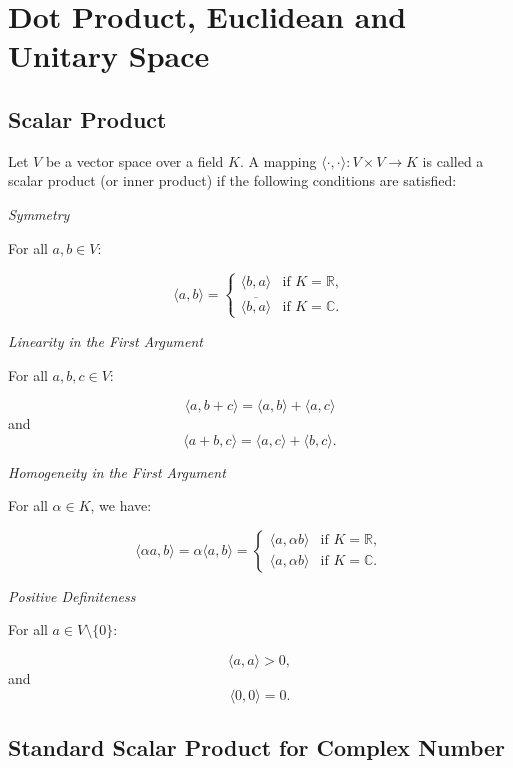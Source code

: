\newpage
\section{Dot Product, Euclidean and Unitary Space}

\subsection{Scalar Product}

Let \(V\) be a vector space over a field \(K\). A mapping \(\langle \cdot, \cdot \rangle : V \times V \to K\) is called a scalar product (or inner product) if the following conditions are satisfied:
\vspace{\baselineskip}

\emph{Symmetry}

For all \(a, b \in V\):

\[
\langle a, b \rangle = 
\begin{cases}
\langle b, a \rangle & \text{if } K = \mathbb{R}, \\
\overline{\langle b, a \rangle} & \text{if } K = \mathbb{C}.
\end{cases}
\]

\emph{Linearity in the First Argument}

For all \(a, b, c \in V\):

\[
\langle a, b + c \rangle = \langle a, b \rangle + \langle a, c \rangle
\]
and
\[
\langle a + b, c \rangle = \langle a, c \rangle + \langle b, c \rangle.
\]

\emph{Homogeneity in the First Argument}

For all \(\alpha \in K\), we have:

\[
\langle \alpha a, b \rangle = \alpha \langle a, b \rangle = 
\begin{cases}
\langle a, \alpha b \rangle & \text{if } K = \mathbb{R}, \\
\langle a, \alpha b \rangle & \text{if } K = \mathbb{C}.
\end{cases}
\]

\emph{Positive Definiteness}

For all \(a \in V \setminus \{0\}\):

\[
\langle a, a \rangle > 0,
\]
and
\[
\langle 0, 0 \rangle = 0.
\]

\subsection{Standard Scalar Product for Complex Number}

